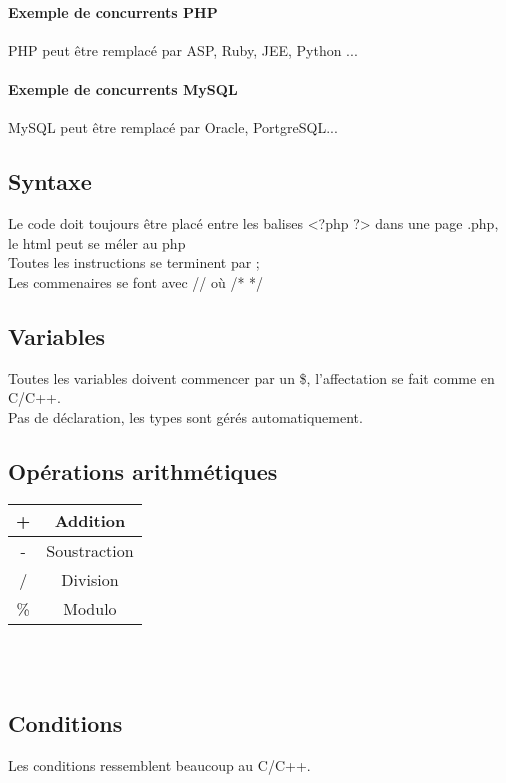 \documentclass[12pt,a4paper,openany]{article}
\begin{document}
		\paragraph{Exemple de concurrents PHP} PHP peut être remplacé par ASP, 
		Ruby, JEE, Python ... \\
		\paragraph{Exemple de concurrents MySQL} MySQL peut être remplacé 
			par Oracle, PortgreSQL...
%			
		\subsection{Syntaxe}
			Le code doit toujours être placé entre les balises <?php ?> dans une 
			page .php, le html peut se méler au php\\
			Toutes les instructions se terminent par ;\\
			Les commenaires se font avec // où /* */ \\
			
		\subsection{Variables}
			Toutes les variables doivent commencer par un \$, l'affectation
			se fait comme en C/C++.\\
			Pas de déclaration, les types sont gérés automatiquement.
			
			\subsection{Opérations arithmétiques}
				\begin{tabular}{|c|c|}
					\hline
						+ & Addition\\
					\hline
						- & Soustraction  \\
					\hline
						/ & Division\\
					\hline	
						\% & Modulo\\
					\hline	
				\end{tabular}\\ \\
			
		\subsection{Conditions}
			Les conditions ressemblent beaucoup au C/C++.
\end{document}
